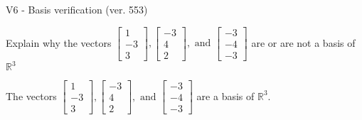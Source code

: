 \begin{exercise}
  \begin{exerciseTitle}V6 - Basis verification (ver. 553)\end{exerciseTitle}
  \begin{exerciseStatement}
    Explain why the vectors \(\left[\begin{array}{r}
1 \\
-3 \\
3
\end{array}\right] , \left[\begin{array}{r}
-3 \\
4 \\
2
\end{array}\right] , \text{ and } \left[\begin{array}{r}
-3 \\
-4 \\
-3
\end{array}\right]\) are or are not a basis of \(\mathbb{R}^3\)	


  \end{exerciseStatement}
  \begin{exerciseAnswer}
   The vectors \(\left[\begin{array}{r}
1 \\
-3 \\
3
\end{array}\right] , \left[\begin{array}{r}
-3 \\
4 \\
2
\end{array}\right] , \text{ and } \left[\begin{array}{r}
-3 \\
-4 \\
-3
\end{array}\right]\) 
  	 are  a basis of \(\mathbb{R}^3\).
  


  \end{exerciseAnswer}
\end{exercise}